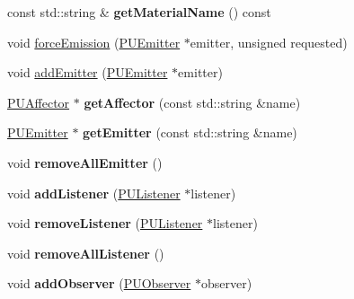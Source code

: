 \begin{DoxyCompactItemize}
\mbox{\label{classPUParticleSystem3D_a8025f1e86818361e4c9dc5042a9dc658}} 
const std\+::string \& {\bfseries get\+Material\+Name} () const
\item 
void \hyperlink{classPUParticleSystem3D_abc2757bc7cd26511bdce5d0dd85f0d8a}{force\+Emission} (\hyperlink{classPUEmitter}{P\+U\+Emitter} $\ast$emitter, unsigned requested)
\item 
void \hyperlink{classPUParticleSystem3D_aa317775b911d27623d6b7f61733f6a32}{add\+Emitter} (\hyperlink{classPUEmitter}{P\+U\+Emitter} $\ast$emitter)
\item 
\mbox{\label{classPUParticleSystem3D_aecd1a2515e6af6b979df9bd3805665b8}} 
\hyperlink{classPUAffector}{P\+U\+Affector} $\ast$ {\bfseries get\+Affector} (const std\+::string \&name)
\item 
\mbox{\label{classPUParticleSystem3D_a4ae3c8549b762a36e176cb3823d9f21d}} 
\hyperlink{classPUEmitter}{P\+U\+Emitter} $\ast$ {\bfseries get\+Emitter} (const std\+::string \&name)
\item 
\mbox{\label{classPUParticleSystem3D_afa5e3778dfd6efa7f7d4d47906d416bc}} 
void {\bfseries remove\+All\+Emitter} ()
\item 
\mbox{\label{classPUParticleSystem3D_a98a118ebe14fbd13b75fa288e36e9c54}} 
void {\bfseries add\+Listener} (\hyperlink{classPUListener}{P\+U\+Listener} $\ast$listener)
\item 
\mbox{\label{classPUParticleSystem3D_a2187a0d7c33077f2a2c044fb52a27864}} 
void {\bfseries remove\+Listener} (\hyperlink{classPUListener}{P\+U\+Listener} $\ast$listener)
\item 
\mbox{\label{classPUParticleSystem3D_a081cd49af03841b7c5b3ef66e23540ef}} 
void {\bfseries remove\+All\+Listener} ()
\item 
\mbox{\label{classPUParticleSystem3D_a9ddd4a5cc1e7500811bb62ab62d71545}} 
void {\bfseries add\+Observer} (\hyperlink{classPUObserver}{P\+U\+Observer} $\ast$observer)
\item 
\mbox{\label{classPUParticleSystem3D_a9803cdc07fda633ee9b19b5c0b88093a}} 

\end{DoxyCompactItemize}
